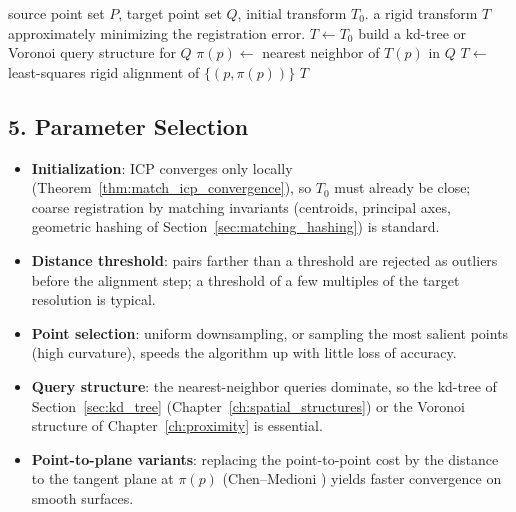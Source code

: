 \begin{algorithm}[htbp]
\caption{Iterative Closest Point}
\label{alg:match_icp}
\begin{algorithmic}[1]
\Require source point set $P$, target point set $Q$, initial transform $T_0$.
\Ensure a rigid transform $T$ approximately minimizing the registration error.
  \State $T \gets T_0$
  \Repeat
    \State build a kd-tree or Voronoi query structure for $Q$
      \State $\pi(p) \gets$ nearest neighbor of $T(p)$ in $Q$ 
    \EndFor
    \State $T \gets$ least-squares rigid alignment of $\{(p, \pi(p))\}$
  \State \Return $T$
\EndFunction
\end{algorithmic}
\end{algorithm}

\subsection{5. Parameter Selection}

\begin{itemize}
\item \textbf{Initialization}: ICP converges only locally
  (Theorem~\ref{thm:match_icp_convergence}), so $T_0$ must already be close;
  coarse registration by matching invariants (centroids, principal axes,
  geometric hashing of Section~\ref{sec:matching_hashing}) is standard.
\item \textbf{Distance threshold}: pairs farther than a threshold are
  rejected as outliers before the alignment step; a threshold of a few
  multiples of the target resolution is typical.
\item \textbf{Point selection}: uniform downsampling, or sampling the most
  salient points (high curvature), speeds the algorithm up with little loss
  of accuracy.
\item \textbf{Query structure}: the nearest-neighbor queries dominate, so
  the kd-tree of Section~\ref{sec:kd_tree} (Chapter~\ref{ch:spatial_structures})
  or the Voronoi structure of Chapter~\ref{ch:proximity} is essential.
\item \textbf{Point-to-plane variants}: replacing the point-to-point cost by
  the distance to the tangent plane at $\pi(p)$ (Chen--Medioni
  \cite{chen1992}) yields faster convergence on smooth surfaces.
\end{itemize}

